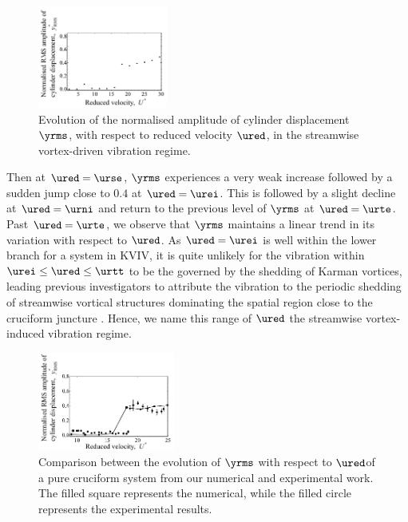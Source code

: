 \documentclass[a4paper,fleqn]{cas-sc}
\begin{document}
\begin{figure}
  \centering
  \includegraphics[width=0.38\textwidth]{figs/yStrRMS1}
  \caption{Evolution of the normalised \rms{} amplitude of cylinder displacement $\yrms$, with respect to reduced velocity $\ured$, in the streamwise vortex-driven vibration regime.} \label{fig:yStrRMS1}
\end{figure}

Then at $\ured = \urse$, $\yrms$ experiences a very weak increase followed by a sudden jump close to $0.4$ at $\ured = \urei$. This is followed by a slight decline at $\ured = \urni$ and return to the previous level of $\yrms$ at $\ured = \urte$. Past $\ured = \urte$, we observe that $\yrms$ maintains a linear trend in its variation with respect to $\ured$. As $\ured = \urei$ is well within the lower branch for a system in KVIV, it is quite unlikely for the vibration within $\urei \leq \ured \leq \urtt$ to be the governed by the shedding of Karman vortices, leading previous investigators to attribute the vibration to the periodic shedding of streamwise vortical structures dominating the spatial region close to the cruciform juncture \citep{Shirakashi1989,Hemsuwan2018b,Hemsuwan2018d}. Hence, we name this range of $\ured$ the streamwise vortex-induced vibration regime.

\begin{figure}
  \centering
  \includegraphics[width=0.4\textwidth]{figs/expCompareAmp}
  \caption{Comparison between the evolution of $\yrms$ with respect to $\ured$of a pure cruciform system from our numerical and experimental work. The filled square represents the numerical, while the filled circle represents the experimental results.}
  \label{fig:expCompareAmp}
\end{figure}
\end{document}
